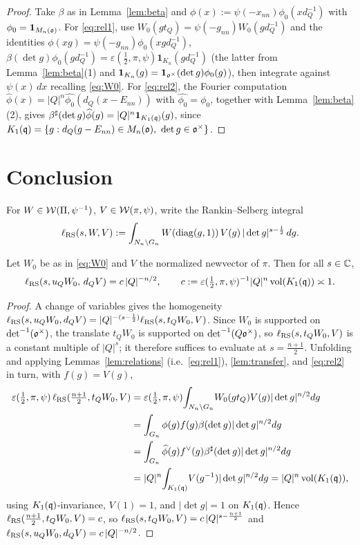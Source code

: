 \documentclass[11pt]{article}
\begin{document}
\begin{proof}
Take $\beta$ as in Lemma~\ref{lem:beta} and
$\phi(x):=\psi(-x_{nn})\phi_0(xd_Q^{-1})$ with $\phi_0=\mathbf 1_{M_n(\mathfrak{o})}$. For
\eqref{eq:rel1}, use $W_0(gt_Q)=\psi(-g_{nn})W_0(gd_Q^{-1})$ and the identities
$\phi(xg)=\psi(-g_{nn})\phi_0(xgd_Q^{-1})$,
$\beta(\det g)\phi_0(gd_Q^{-1})=\varepsilon(\tfrac12,\pi,\psi)\mathbf 1_{K_n}(gd_Q^{-1})$
(the latter from Lemma~\ref{lem:beta}(1) and
$\mathbf 1_{K_n}(g)=\mathbf 1_{\mathfrak{o}^\times}(\det g)\phi_0(g)$), then integrate
against $\psi(x)\,dx$ recalling \eqref{eq:W0}. For \eqref{eq:rel2}, the Fourier
computation $\widehat\phi(x)=|Q|^n\widehat{\phi_0}(d_Q(x-E_{nn}))$ with
$\widehat{\phi_0}=\phi_0$, together with Lemma~\ref{lem:beta}(2), gives
$\beta^\sharp(\det g)\widehat\phi(g)=|Q|^n\mathbf 1_{K_1(\mathfrak{q})}(g)$, since
$K_1(\qtwoqq)=\{g:d_Q(g-E_{nn})\in\qtwoMn(\qtwooo),\ \det g\in\qtwooo^\times\}$.
\end{proof}

\section*{Conclusion}

For $W\in\mathcal{W}(\Pi,\psi^{-1})$, $V\in\mathcal{W}(\pi,\psi)$, write the Rankin--Selberg
integral
\[
\ell_{\mathrm{RS}}(s,W,V):=\int_{N_n\backslash G_n}W(\operatorname{diag}(g,1))\,V(g)\,|\det g|^{s-\frac12}\,dg.
\]

\begin{qtwoproposition}\label{prop:final}
Let $W_0$ be as in \eqref{eq:W0} and $V$ the normalized newvector of $\pi$. Then
for all $s\in\mathbb{C}$,
\[
\ell_{\mathrm{RS}}(s,u_Q W_0,\,d_Q V)=c\,|Q|^{-n/2},\qquad
c:=\varepsilon(\tfrac12,\pi,\psi)^{-1}|Q|^n\operatorname{vol}(K_1(\mathfrak{q}))\asymp 1.
\]
\end{qtwoproposition}

\begin{proof}
A change of variables gives the homogeneity
$\ell_{\mathrm{RS}}(s,u_Q W_0,d_Q V)=|Q|^{-(s-\frac12)}\ell_{\mathrm{RS}}(s,t_Q W_0,V)$. Since $W_0$ is
supported on $\det^{-1}(\mathfrak{o}^\times)$, the translate $t_Q W_0$ is supported on
$\det^{-1}(Q\mathfrak{o}^\times)$, so $\ell_{\mathrm{RS}}(s,t_Q W_0,V)$ is a constant multiple of
$|Q|^s$; it therefore suffices to evaluate at $s=\tfrac{n+1}{2}$. Unfolding and
applying Lemmas~\ref{lem:relations} (i.e.\ \eqref{eq:rel1}), \ref{lem:transfer},
and \eqref{eq:rel2} in turn, with $f(g)=V(g)$,
\begin{align*}
\varepsilon(\tfrac12,\pi,\psi)\,\ell_{\mathrm{RS}}(\tfrac{n+1}{2},t_Q W_0,V)
&=\varepsilon(\tfrac12,\pi,\psi)\!\int_{N_n\backslash G_n}\!W_0(gt_Q)V(g)|\det g|^{n/2}dg\\
&=\int_{G_n}\phi(g)f(g)\beta(\det g)|\det g|^{n/2}dg\\
&=\int_{G_n}\widehat\phi(g)f^\vee(g)\beta^\sharp(\det g)|\det g|^{n/2}dg\\
&=|Q|^n\!\int_{K_1(\mathfrak{q})}\!V(g^{-1})|\det g|^{n/2}dg
=|Q|^n\operatorname{vol}(K_1(\mathfrak{q})),
\end{align*}
using $K_1(\mathfrak{q})$-invariance, $V(1)=1$, and $|\det g|=1$ on $K_1(\mathfrak{q})$. Hence
$\ell_{\mathrm{RS}}(\tfrac{n+1}{2},t_Q W_0,V)=c$, so $\ell_{\mathrm{RS}}(s,t_Q W_0,V)=c\,|Q|^{s-\frac{n+1}{2}}$
and $\ell_{\mathrm{RS}}(s,u_Q W_0,d_Q V)=c\,|Q|^{-n/2}$.
\end{proof}
\end{document}
